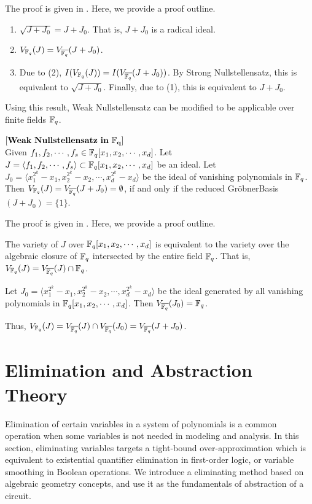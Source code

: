 The proof is given in \cite{gao:gf-gb-ms}. Here, we provide a proof outline.

\begin{Proof}
\begin{enumerate}
\item $\sqrt{J+J_0} = J+J_0$. That is, $J+J_0$ is a radical ideal.
\item $V_{{\mathbb{F}}_{q}}(J)=V_{\overline{{\mathbb{F}}_{q}}}(J+J_0)$.
\item Due to (2), $I(V_{{\mathbb{F}}_{q}}(J)) = I(V_{\overline{{\mathbb{F}}_{q}}}(J+J_0))$. 
By Strong Nullstellensatz, this is equivalent to $\sqrt{J+J_0}$.
Finally, due to (1), this is equivalent to $J+J_0$.
\end{enumerate}
\end{Proof}


Using this result, Weak Nullstellensatz can be 
modified to be applicable over finite fields ${\mathbb{F}}_{q}$.
\begin{Theorem}\label{wnull:ff}
$[\bf{Weak~Nullstellensatz~in~{\mathbb{F}}_{q}}]$\cite{null:1890}\\
Given $f_1,f_2,\cdots,f_s \in {\mathbb{F}}_{q}[x_1,x_2,\cdots,x_d]$. 
Let $J=\langle f_1,f_2,\cdots,f_s\rangle \subset {\mathbb{F}}_{q}[x_1,
x_2, \cdots, x_d]$ be an ideal. Let $J_0 = \langle 
x_1^{2^k}-x_1,x_2^{2^k}-x_2,\cdots,x_d^{2^k}-x_d \rangle$ be the ideal
of vanishing polynomials in ${\mathbb{F}}_{q}$. Then
$V_{{\mathbb{F}}_{q}}(J) = V_{\overline {{\mathbb{F}}_{q}}}(J +
J_0)=\emptyset$,  if and only if the reduced
Gr\"obnerBasis$(J+J_{0})=\{1\}$. 
\end{Theorem}

The proof is given in \cite{null:1890}. Here, we provide a proof outline.

\begin{Proof}
The variety of $J$ over ${\mathbb{F}}_{q}[x_1,x_2,\cdots,x_d]$ 
is equivalent to the variety over the algebraic closure of ${\mathbb{F}}_{q}$ 
intersected by the entire field ${\mathbb{F}}_{q}$. That is, $V_{{\mathbb{F}}_{q}}(J)=V_{\overline 
{{\mathbb{F}}_{q}}}(J) \cap {\mathbb{F}}_{q}$. 

Let $J_0 = \langle 
x_1^{2^k}-x_1,x_2^{2^k}-x_2,\cdots,x_d^{2^k}-x_d \rangle$ be the ideal
generated by all vanishing polynomials in ${\mathbb{F}}_{q}[x_1,x_2,\cdots,x_d]$.
Then $V_{\overline{{\mathbb{F}}_{q}}}(J_0)={\mathbb{F}}_{q}$. 

Thus, $V_{{\mathbb{F}}_{q}}(J) = V_{\overline{{\mathbb{F}}_{q}}}(J)\cap V_{\overline{{\mathbb{F}}_{q}}}(J_0)
= V_{\overline{{\mathbb{F}}_{q}}}(J+J_0)$.
\end{Proof}


\section{Elimination and Abstraction Theory}
\label{sec:abstraction}
Elimination of certain variables in a system of polynomials is a common 
operation when some variables is not needed in modeling and analysis. 
In this section, eliminating variables targets a tight-bound over-approximation 
which is equivalent to existential quantifier elimination in first-order logic,
or variable smoothing in Boolean operations. We introduce a eliminating method 
based on algebraic geometry concepts, and use it as the fundamentals of 
abstraction of a circuit.

